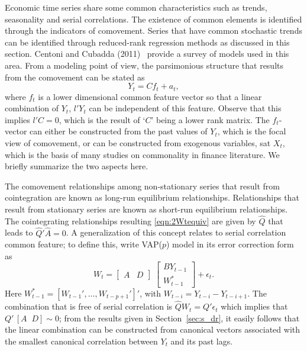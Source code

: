 Economic time series share some common characteristics such as trends, seasonality and serial correlations. The existence of common elements is identified through the indicators of comovement. Series that have common stochastic trends can be identified through reduced-rank regression methods as discussed in this section. Centoni and Cubadda (2011)~\cite{centoni} provide a survey of models used in this area. From a modeling point of view, the parsimonious structure that results from the comovement can be stated as
	\begin{equation} \label{eqn:discyt}
	Y_t= Cf_t + a_t,
	\end{equation}  
where $f_t$ is a lower dimensional common feature vector so that a linear combination of $Y_t$, $l' Y_t$ can be independent of this feature. Observe that this implies $l'C=0$, which is the result of `$C$' being a lower rank matrix. The $f_t$-vector can either be constructed from the past values of $Y_t$, which is the focal view of comovement, or can be constructed from exogenous variables, sat $X_t$, which is the basis of many studies on commonality in finance literature. We briefly summarize the two aspects here. 


The comovement relationships among non-stationary series that result from cointegration are known as long-run equilibrium relationships. Relationships that result from stationary series are known as short-run equilibrium relationships. The cointegrating relationships resulting \eqref{eqn:2Wtequiv} are given by $\hat{Q}$ that leads to $\hat{Q}' \hat{A}=0$. A generalization of this concept relates to serial correlation common feature; to define this, write VAP($p$) model in its error correction form as\label{in:vec2}
	\begin{equation} \label{eqn:2WteqAD}
	W_t=  \begin{bmatrix} A & D \end{bmatrix} \; \begin{bmatrix} BY_{t-1} \\ W_{t-1}^* \end{bmatrix} + \epsilon_t.
	\end{equation}
Here $W_{t-1}^*= [W_{t-1}', \ldots, W_{t-p+1}']'$, with $W_{t-i}= Y_{t-i} - Y_{t-i+1}$. The combination that is free of serial correlation is $\hat{Q} W_t= Q' \epsilon_t$ which implies that $Q' \,[A \;\; D] \sim 0$; from the results given in Section~\ref{sec:s_dr}, it easily follows that the linear combination can be constructed from canonical vectors associated with the smallest canonical correlation between $Y_t$ and its past lags.\label{in:coint2}\label{in:comove2}



